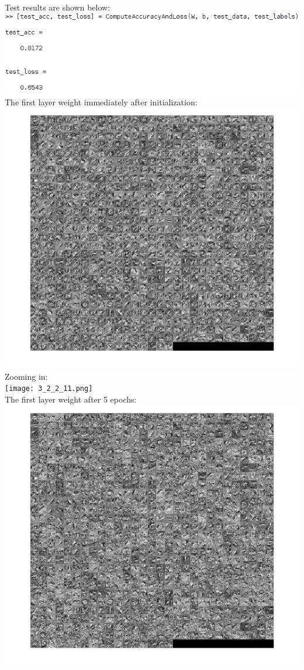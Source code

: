\documentclass[12pt,letterpaper,boxed]{hmcpset}
\begin{document}
\begin{solution}
Test results are shown below:\\
\includegraphics[width=\textwidth]{3_2_2_111.png}\\
The first layer weight immediately after initialization:\\
\includegraphics[width=\textwidth]{3_2_2_1.png}\\
Zooming in:\\
\texttt{[image: 3\_2\_2\_11.png]}\\
\newpage
The first layer weight after 5 epochs:\\
\includegraphics[width=\textwidth]{3_2_2_2.png}\\

\end{solution}
\end{document}
